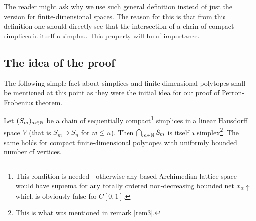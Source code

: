 \documentclass{article}
\begin{document}
\begin{remark}\label{rem3}
The reader might ask why we use such general definition instead of just the version for finite-dimensional spaces. The reason for this is that from this definition one should directly see that the intersection of a chain of compact simplices is itself a simplex. This property will be of importance.
\end{remark}

\subsection{The idea of the proof}

The following simple fact about simplices and finite-dimensional polytopes shall be mentioned at this point as they were the initial idea for our proof of Perron-Frobenius theorem.

\begin{lemma}\label{lem0}
Let $(S_m)_{m\in\mathbb{N}}$ be a chain of sequentially compact\footnote{This condition is needed - otherwise any based Archimedian lattice space would have suprema for any totally ordered non-decreasing bounded net $x_\alpha\uparrow$ which is obviously false for $C[0,1]$.} simplices in a linear Hausdorff space $V$ (that is $S_m\supset S_n$ for $m\leq n$). Then $\bigcap_{m\in\mathbb{N}}{S_m}$ is itself a simplex\footnote{This is what was mentioned in remark \ref{rem3}.}. The same holds for compact finite-dimensional polytopes with uniformly bounded number of vertices.
\end{lemma}
\end{document}
